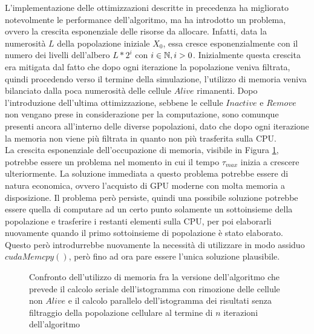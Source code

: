 L'implementazione delle ottimizzazioni descritte in precedenza
ha migliorato notevolmente
le performance dell'algoritmo, ma ha introdotto un problema, ovvero la crescita
esponenziale delle risorse da allocare.
Infatti, data la numerosità $L$ della popolazione iniziale $X_{0}$, essa cresce
esponenzialmente con il numero dei livelli dell'albero $L * 2^i$ con
$i \in \mathbb{N}, i > 0$. Inizialmente questa crescita era mitigata dal fatto che
dopo ogni iterazione la popolazione veniva filtrata, quindi procedendo verso
il termine della simulazione, l'utilizzo di memoria veniva bilanciato dalla
poca numerosità delle cellule $Alive$ rimanenti.
Dopo l'introduzione dell'ultima ottimizzazione, sebbene le cellule $Inactive$ e
$Remove$ non vengano prese in considerazione per la computazione, sono
comunque presenti ancora all'interno delle diverse popolazioni, dato che
dopo ogni iterazione la memoria non viene più filtrata in quanto non più
trasferita sulla CPU.
\\
La crescita esponenziale dell'occupazione di memoria, visibile in Figura
\ref{chart:serial-parallel-histogram}, potrebbe essere un
problema nel momento in cui il tempo $\tau_{max}$ inizia a crescere
ulteriormente. La soluzione immediata a questo problema potrebbe essere di
natura economica, ovvero l'acquisto di GPU moderne con molta memoria a
disposizione. Il problema però persiste, quindi una possibile soluzione
potrebbe essere quella di computare ad un certo punto solamente un sottoinsieme
della popolazione e trasferire i restanti elementi sulla CPU, per poi
elaborarli nuovamente quando il primo sottoinsieme di popolazione è stato
elaborato. Questo però introdurrebbe nuovamente la necessità di utilizzare
in modo assiduo $cudaMemcpy()$, però fino ad ora pare essere l'unica soluzione
plausibile.
\begin{figure}[t]
    \centering
    \caption{Confronto dell'utilizzo di memoria fra la versione dell'algoritmo
        che prevede il calcolo seriale dell'istogramma con rimozione delle
        cellule non $Alive$ e il calcolo parallelo dell'istogramma dei risultati
        senza filtraggio della popolazione cellulare al termine di $n$ iterazioni
        dell'algoritmo}
    \label{chart:serial-parallel-histogram} 
\end{figure}
